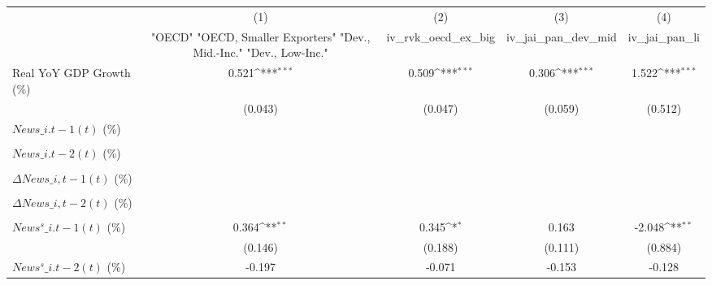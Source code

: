 {
\def\sym#1{\ifmmode^{#1}\else\(^{#1}\)\fi}
\begin{tabular}{l*{4}{c}}
\toprule
                    &\multicolumn{1}{c}{(1)}&\multicolumn{1}{c}{(2)}&\multicolumn{1}{c}{(3)}&\multicolumn{1}{c}{(4)}\\
                    &\multicolumn{1}{c}{ "OECD" "OECD, Smaller Exporters" "Dev., Mid.-Inc." "Dev., Low-Inc."}&\multicolumn{1}{c}{iv\_rvk\_oecd\_ex\_big}&\multicolumn{1}{c}{iv\_jai\_pan\_dev\_mid}&\multicolumn{1}{c}{iv\_jai\_pan\_li}\\
\midrule
Real YoY GDP Growth (\%)&       0.521\sym{***}&       0.509\sym{***}&       0.306\sym{***}&       1.522\sym{***}\\
                    &     (0.043)         &     (0.047)         &     (0.059)         &     (0.512)         \\
\addlinespace
$ News\_{i.t-1}(t)$ (\%)&                     &                     &                     &                     \\
                    &                     &                     &                     &                     \\
\addlinespace
$ News\_{i.t-2}(t)$ (\%)&                     &                     &                     &                     \\
                    &                     &                     &                     &                     \\
\addlinespace
$ \Delta News\_{i,t-1}(t)$ (\%)&                     &                     &                     &                     \\
                    &                     &                     &                     &                     \\
\addlinespace
$ \Delta News\_{i,t-2}(t)$ (\%)&                     &                     &                     &                     \\
                    &                     &                     &                     &                     \\
\addlinespace
$ News^s\_{i.t-1}(t)$ (\%)&       0.364\sym{**} &       0.345\sym{*}  &       0.163         &      -2.048\sym{**} \\
                    &     (0.146)         &     (0.188)         &     (0.111)         &     (0.884)         \\
\addlinespace
$ News^s\_{i.t-2}(t)$ (\%)&      -0.197         &      -0.071         &      -0.153         &      -0.128         \\

\end{tabular}}
